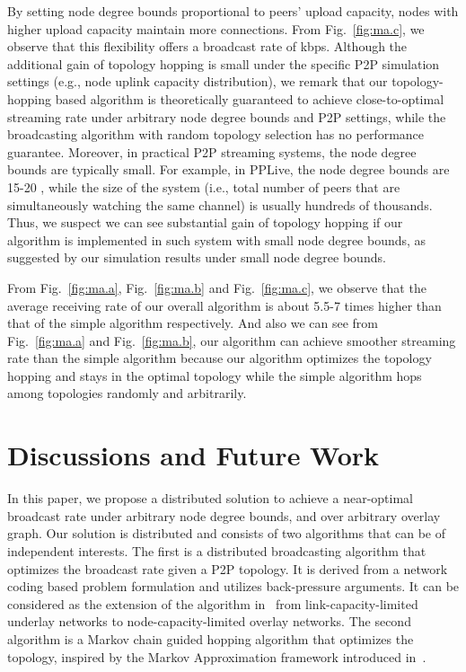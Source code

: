 \documentclass[10pt,conference]{IEEEtran}
\begin{document}
By setting node degree bounds proportional to peers' upload capacity, nodes with higher upload capacity maintain more connections. From Fig.~\ref{fig:ma.c}, we observe that this flexibility offers a broadcast rate of  kbps. Although the additional gain of topology hopping is small under the specific P2P simulation settings (e.g., node uplink capacity distribution), we remark that our topology-hopping based algorithm is theoretically guaranteed to achieve close-to-optimal streaming rate under arbitrary node degree bounds and P2P settings, while the broadcasting algorithm with random topology selection has no performance guarantee. Moreover, in practical P2P streaming systems, the node degree bounds are typically small. For example, in PPLive, the node degree bounds are 15-20 \cite{streaming_capacity.allerton09}, while the size of the system (i.e., total number of peers that are simultaneously watching the same channel) is usually hundreds of thousands. Thus, we suspect we can see substantial gain of topology hopping if our algorithm is implemented in such system with small node degree bounds, as suggested by our simulation results under small node degree bounds.

From Fig.~\ref{fig:ma.a}, Fig.~\ref{fig:ma.b} and Fig.~\ref{fig:ma.c}, we observe that the average receiving rate of our overall algorithm is about 5.5-7 times higher than that of the simple algorithm respectively. And also we can see from Fig.~\ref{fig:ma.a} and Fig.~\ref{fig:ma.b}, our algorithm can achieve smoother streaming rate than the simple algorithm because our algorithm optimizes the topology hopping and stays in the optimal topology while the simple algorithm hops among topologies randomly and arbitrarily.

\section{Discussions and Future Work}

\label{sec:conclusion}

In this paper, we propose a distributed solution to achieve a
near-optimal broadcast rate under arbitrary node degree bounds, and
over arbitrary overlay graph. Our solution is distributed and
consists of two algorithms that can be of independent interests. The
first is a distributed broadcasting algorithm that optimizes the
broadcast rate given a P2P topology. It is derived from a network
coding based problem formulation and utilizes back-pressure
arguments. It can be considered as the extension of the algorithm
in~\cite{ho2009dynamic} from link-capacity-limited underlay networks
to node-capacity-limited overlay networks. The second algorithm is a
Markov chain guided hopping algorithm that optimizes the topology,
inspired by the Markov Approximation framework introduced
in~\cite{MA:CLSC10}.
\end{document}
